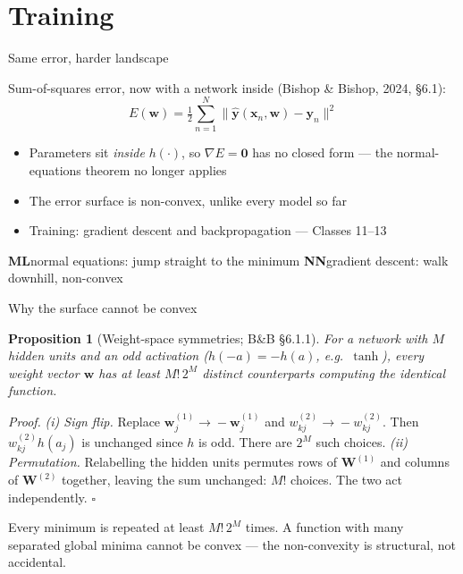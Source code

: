 \documentclass[aspectratio=169, 11pt]{beamer}
\newtheorem{propx}[theorem]{Proposition}
\newcommand{\mlparallel}[2]{%
  \vfill
  {\scriptsize
  \begin{tcolorbox}[enhanced, sidebyside, sidebyside align=top,
                    lefthand ratio=0.485,
                    segmentation style={mlc!35, line width=0.6pt},
                    colback=mlc!5, colframe=mlc!35, boxrule=0.5pt,
                    arc=1.2mm, left=1.6mm, right=1.6mm,
                    top=0.6mm, bottom=0.6mm,
                    before skip=0pt, after skip=0pt]
    {\color{mlc}\textbf{ML}}\hspace{0.55em}#1
  \tcblower
    {\color{nnc}\textbf{NN}}\hspace{0.55em}#2
  \end{tcolorbox}}%
  \vspace{0.35em}%
}
\newcommand{\src}[3]{}      %
\begin{document}
\section{Training}

\begin{frame}{Same error, harder landscape}
  \src{bishop2024}{equation}{6.29}
  \src{bishop2024}{section}{6.4.1}
  Sum-of-squares error, now with a network inside
  (Bishop \& Bishop, 2024, \S6.1):
  \[
    E(\mathbf{w}) = \tfrac{1}{2}\sum_{n=1}^{N}
    \big\lVert \hat{\mathbf{y}}(\mathbf{x}_n,\mathbf{w})
    - \mathbf{y}_n\big\rVert^2
  \]
  \vspace{-0.3em}
  \begin{itemize}\setlength{\itemsep}{1pt}
    \item {\small Parameters sit \emph{inside} $h(\cdot)$, so
          $\nabla E=\mathbf{0}$ has \alert{no closed form} ---
          the normal-equations theorem no longer applies}
    \item {\small The error surface is \alert{non-convex}, unlike
          every model so far}
    \item {\small Training: gradient descent and backpropagation
          --- Classes 11--13}
  \end{itemize}
  \mlparallel{normal equations: jump straight to the minimum}
             {gradient descent: walk downhill, non-convex}
\end{frame}

\begin{frame}{Why the surface cannot be convex}
  \src{bishop2024}{section}{6.2.4}
  \begin{propx}[Weight-space symmetries; B\&B \S6.1.1]
    For a network with $M$ hidden units and an odd activation
    ($h(-a)=-h(a)$, e.g.\ $\tanh$), every weight vector
    $\mathbf{w}$ has at least $M!\,2^{M}$ distinct counterparts
    computing the \alert{identical} function.
  \end{propx}
  \vspace{0.1em}
  {\footnotesize
  \emph{Proof.}
  \emph{(i) Sign flip.} Replace
  $\mathbf{w}^{(1)}_j\!\to\!-\mathbf{w}^{(1)}_j$ and
  $w^{(2)}_{kj}\!\to\!-w^{(2)}_{kj}$. Then
  $w^{(2)}_{kj}h(a_j)$ is unchanged since $h$ is odd. There are
  $2^{M}$ such choices.
  \emph{(ii) Permutation.} Relabelling the hidden units permutes
  rows of $\mathbf{W}^{(1)}$ and columns of $\mathbf{W}^{(2)}$
  together, leaving the sum unchanged: $M!$ choices. The two act
  independently. \hfill$\square$}
  \vspace{0.3em}
  \begin{redhighlight}
    {\small Every minimum is repeated at least $M!\,2^{M}$ times.
    A function with many separated global minima cannot be convex
    --- the non-convexity is \alert{structural}, not accidental.}
  \end{redhighlight}
\end{frame}
\end{document}
